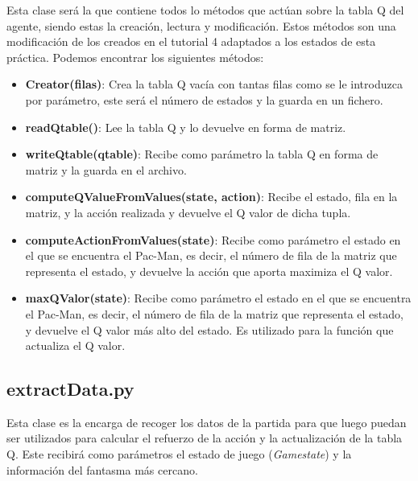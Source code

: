 \documentclass[11pt,a4paper]{article}
\begin{document}
Esta clase será la que contiene todos lo métodos que actúan sobre la tabla Q del agente, siendo estas la creación, lectura y modificación. Estos métodos son una modificación de los creados en el tutorial 4 adaptados a los estados de esta práctica. Podemos encontrar los siguientes métodos:

\begin{itemize}

\item\textbf{Creator(filas)}: Crea la tabla Q vacía con tantas filas como se le introduzca por parámetro, este será el número de estados y la guarda en un fichero.

\item\textbf{readQtable()}: Lee la tabla Q y lo devuelve en forma de matriz.

\item\textbf{writeQtable(qtable)}: Recibe como parámetro la tabla Q en forma de matriz y la guarda en el archivo.

\item\textbf{computeQValueFromValues(state, action)}: Recibe el estado, fila en la matriz, y la acción realizada y devuelve el Q valor de dicha tupla.

\item\textbf{computeActionFromValues(state)}: Recibe como parámetro el estado en el que se encuentra el Pac-Man, es decir, el número de fila de la matriz que representa el estado, y devuelve la acción que aporta maximiza el Q valor.

\item\textbf{maxQValor(state)}: Recibe como parámetro el estado en el que se encuentra el Pac-Man, es decir, el número de fila de la matriz que representa el estado, y devuelve el Q valor más alto del estado. Es utilizado para la función que actualiza el Q valor.

\end{itemize}

\subsection{extractData.py}

Esta clase es la encarga de recoger los datos de la partida para que luego puedan ser utilizados para calcular el refuerzo de la acción y la actualización de la tabla Q. Este recibirá como parámetros el estado de juego (\textit{Gamestate}) y la información del fantasma más cercano.

\paragraph{}
\end{document}
